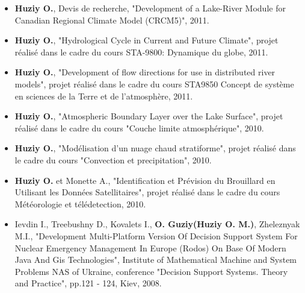 \vspace{\vertspace}

{
\renewcommand{\labelitemi}{}

\begin{itemize}
    \item \textbf{Huziy O.}, Devis de recherche, "Development of a
    Lake-River Module for Canadian Regional Climate Model (CRCM5)", 2011.

    \item \textbf{Huziy O.}, "Hydrological Cycle in Current and Future Climate",
    projet réalisé dans le cadre du cours STA-9800: Dynamique du globe, 2011.

    \item \textbf{Huziy O.}, "Development of flow directions for use in
    distributed river models", projet réalisé dans le cadre du cours STA9850
    Concept de système en sciences de la Terre et de l'atmosphère, 2011.

    \item \textbf{Huziy O.}, "Atmospheric Boundary Layer over the Lake Surface",
           projet réalisé dans le cadre du cours "Couche limite atmosphérique",
           2010.

    \item \textbf{Huziy O.}, "Modélisation d’un nuage chaud stratiforme",
       projet réalisé dans le cadre du cours "Convection et precipitation", 2010.

    \item \textbf{Huziy O.} et Monette A., "Identification et Prévision du
    Brouillard en Utilisant les Données Satellitaires", projet réalisé dans le cadre du cours Météorologie et télédetection, 
    2010.


    \item Ievdin I., Treebushny D., Kovalets I., \textbf{O. Guziy(Huziy O.
    M.)}, Zheleznyak M.I., "Development Multi-Platform Version Of Decision
    Support System For Nuclear Emergency Management In Europe (Rodos) On Base Of Modern Java And Gis Technologies",
    Institute of Mathematical Machine and System Problems NAS of Ukraine, conference
    "Decision Support Systems. Theory and Practice", pp.121 - 124, Kiev, 2008.
\end{itemize}
}

